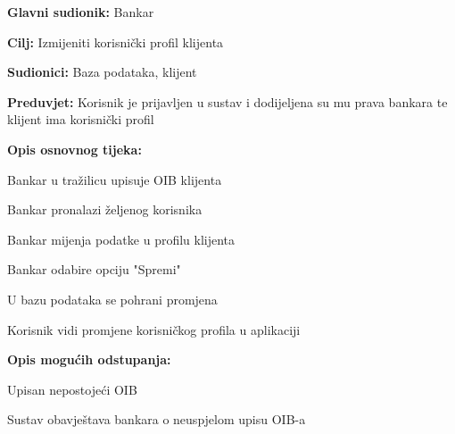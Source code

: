                 
                \noindent {}
                \begin{packed_item}
                
                  \item \textbf{Glavni sudionik: }Bankar
                  \item  \textbf{Cilj:} Izmijeniti korisnički profil klijenta 
                  \item  \textbf{Sudionici:} Baza podataka, klijent
                  \item  \textbf{Preduvjet:} Korisnik je prijavljen u sustav i dodijeljena su mu prava bankara te klijent ima korisnički profil
                  \item  \textbf{Opis osnovnog tijeka:}
                  
                  \item[] \begin{packed_enum}
                
                    \item  Bankar u tražilicu upisuje OIB klijenta
                    \item  Bankar pronalazi željenog korisnika
                    \item  Bankar mijenja podatke u profilu klijenta
                    \item  Bankar odabire opciju "Spremi"
                    \item  U bazu podataka se pohrani promjena                     
                    \item  Korisnik vidi promjene korisničkog profila u aplikaciji 
                  \end{packed_enum}
                  
                  \item  \textbf{Opis mogućih odstupanja:}
                  
                  \item[] \begin{packed_item}
                  	
                  	 \item[1.a] Upisan nepostojeći OIB
                  	\item[] \begin{packed_enum}
                  		
                  		\item Sustav obavještava bankara o neuspjelom upisu OIB-a 
                  		

\end{packed_enum}
\end{packed_item}
\end{packed_item}
